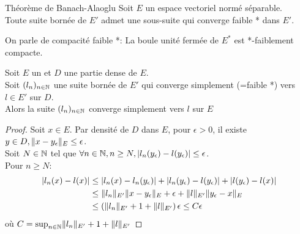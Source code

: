 \documentclass[]{report}
\begin{document}
    \begin{tm}{Théorème de Banach-Alaoglu}{}
        Soit $E$ un espace vectoriel normé séparable.\\
        Toute suite bornée de $E'$ admet une sous-suite qui converge faible * dans $E'$.
    \end{tm}

    \begin{re}{}{}
        On parle de compacité faible *: La boule unité fermée de $E^*$ est *-faiblement compacte.
    \end{re}

    \begin{lm}{}{}
        Soit $E$ un \evn et $D$ une partie dense de $E$.\\
        Soit $(l_n)_{n\in\mathbb{N}}$ une suite bornée de $E'$ qui converge simplement (=faible *) vers $l\in E'$ sur $D$. \\
        Alors la suite $(l_n)_{n\in\mathbb{N}}$ converge simplement vers $l$ sur $E$
    \end{lm}

    \begin{proof}
        Soit $x\in E$. Par densité de $D$ dans $E$, pour $\epsilon>0$, il existe $y\in D, \lVert x-y_\epsilon \rVert_E\le \epsilon$.\\
        Soit $N\in \mathbb{N}$ tel que $\forall n\in \mathbb{N},n\ge N, \left|l_n(y_\epsilon)-l(y_\epsilon)\right|\le \epsilon$.\\
        Pour $n\ge N$:\begin{align*}
            \left|l_n(x)-l(x)\right|&\le \left|l_n(x)-l_n(y_\epsilon)\right|+\left|l_n(y_\epsilon)-l(y_\epsilon)\right|+\left|l(y_\epsilon)-l(x)\right|\\
            &\le \lVert l_n \rVert_{E'}\lVert x-y_\epsilon \rVert_E+\epsilon+\lVert l \rVert_{E'}\lVert y_\epsilon-x \rVert_{E}\\
            &\le \left(\lVert l_n \rVert_{E'}+1+\lVert l \rVert_{E'}\right)\epsilon\le C\epsilon
        \end{align*}
        où $C=\sup_{{n\in\mathbb{N}}}\lVert l_n \rVert_{E'}+1+\lVert l \rVert_{E'}$
    \end{proof}
\end{document}

